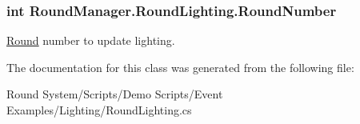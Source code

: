 \subsubsection[{Round\+Number}]{\setlength{\rightskip}{0pt plus 5cm}int Round\+Manager.\+Round\+Lighting.\+Round\+Number}\label{class_round_manager_1_1_round_lighting_abfc7abd8d147288729e66041060f6cb6}


\hyperlink{class_round_manager_1_1_round}{Round} number to update lighting. 



The documentation for this class was generated from the following file\+:\begin{DoxyCompactItemize}
\item 
Round System/\+Scripts/\+Demo Scripts/\+Event Examples/\+Lighting/Round\+Lighting.\+cs\end{DoxyCompactItemize}
